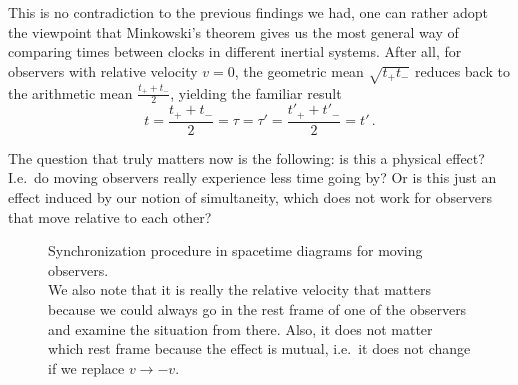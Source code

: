 \documentclass[../relativity_main.tex]{subfiles}
\begin{document}
This is no contradiction to the previous findings we had, one can rather adopt the viewpoint that Minkowski's theorem gives us the most general way of comparing times between clocks in different inertial systems. After all, for observers with relative velocity $v = 0$, the geometric mean $\sqrt{t_+ t_-}$ reduces back to the arithmetic mean $\frac{t_+ + t_-}{2}$, yielding the familiar result
\begin{equation}
	t = \frac{t_+ + t_-}{2} = \tau = \tau' = \frac{t'_+ + t'_-}{2} = t' \, .
\end{equation}

The question that truly matters now is the following: is this a physical effect? I.e.~do moving observers really experience less time going by? Or is this just an effect induced by our notion of simultaneity, which does not work for observers that move relative to each other?







\begin{figure}
	\centering
	
	\hspace*{-0.05\textwidth}
	\subfloat[Observers moving with relative velocity $v = 0.6 c$]{
		
	}
	\hspace*{0.05\textwidth}
	\subfloat[Observers moving with relative velocity $v = 0.5 c$]{
		
	}
	\hspace*{0.05\textwidth}
	
	\caption[Synchronization procedure in spacetime diagrams for moving observers]{Synchronization procedure in spacetime diagrams for moving observers.%
	\\
	We also note that it is really the relative velocity that matters because we could always go in the rest frame of one of the observers and examine the situation from there. Also, it does not matter which rest frame because the effect is mutual, i.e.~it does not change if we replace $v \rightarrow -v$.\\
	}
	\label{fig:moving_clocks}
\end{figure}
\end{document}
